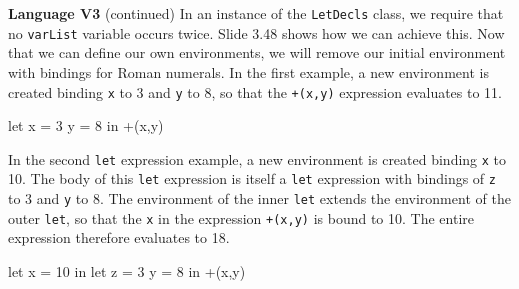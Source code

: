 \begin{minipage}[t]{\sw}
\slidenumber
\LARGE
{\bf Language V3} (continued)\exx
In an instance of the \verb'LetDecls' class,
we require that no \verb'varList' variable occurs twice.
Slide 3.48 shows how we can achieve this.\exx
Now that we can define our own environments,
we will remove our initial environment with bindings
for Roman numerals.\exx
In the first example, a new environment is created
binding \verb'x' to 3 and \verb'y' to 8,
so that the \verb'+(x,y)' expression evaluates to 11.
{\Large
\begin{qv}
let x = 3 y = 8
in +(x,y) %
\end{qv}
}
In the second \verb'let' expression example,
a new environment is created
binding \verb'x' to 10.
The body of this \verb'let' expression
is itself a \verb'let' expression
with bindings of \verb'z' to 3 and \verb'y' to 8.
The environment of the inner \verb'let'
extends the environment of the outer \verb'let',
so that the \verb'x' in the expression \verb'+(x,y)' is bound to 10.
The entire expression therefore evaluates to 18.
{\Large
\begin{qv}
let x = 10
in
  let z = 3 y = 8
  in +(x,y) %
\end{qv}
}
\end{minipage}
\clearpage
